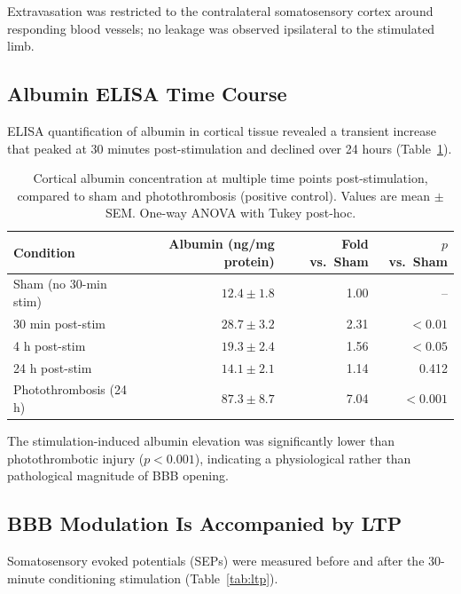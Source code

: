 \documentclass[11pt]{article}
\begin{document}
Extravasation was restricted to the contralateral somatosensory cortex around responding blood vessels; no leakage was observed ipsilateral to the stimulated limb.

\subsection{Albumin ELISA Time Course}

ELISA quantification of albumin in cortical tissue revealed a transient increase that peaked at 30 minutes post-stimulation and declined over 24 hours (Table~\ref{tab:elisa}).

\begin{table}[H]
\centering
\caption{Cortical albumin concentration at multiple time points post-stimulation, compared to sham and photothrombosis (positive control). Values are mean $\pm$ SEM. One-way ANOVA with Tukey post-hoc.}
\label{tab:elisa}
\begin{tabular}{lrrr}
\toprule
\textbf{Condition} & \textbf{Albumin (ng/mg protein)} & \textbf{Fold vs.\ Sham} & \textbf{$p$ vs.\ Sham} \\
\midrule
Sham (no 30-min stim) & $12.4 \pm 1.8$ & 1.00 & -- \\
30 min post-stim & $28.7 \pm 3.2$ & 2.31 & $<0.01$ \\
4 h post-stim & $19.3 \pm 2.4$ & 1.56 & $<0.05$ \\
24 h post-stim & $14.1 \pm 2.1$ & 1.14 & 0.412 \\
Photothrombosis (24 h) & $87.3 \pm 8.7$ & 7.04 & $<0.001$ \\
\bottomrule
\end{tabular}
\end{table}

The stimulation-induced albumin elevation was significantly lower than photothrombotic injury ($p < 0.001$), indicating a physiological rather than pathological magnitude of BBB opening.

\subsection{BBB Modulation Is Accompanied by LTP}

Somatosensory evoked potentials (SEPs) were measured before and after the 30-minute conditioning stimulation (Table~\ref{tab:ltp}).
\end{document}
